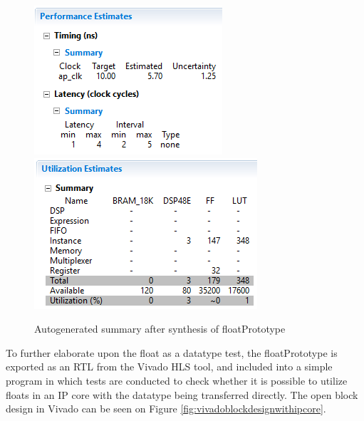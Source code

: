 \begin{figure}[H]
	\centering
	\includegraphics[width=0.428\linewidth]{diagram/floatPrototype_performance_summary}
	\includegraphics[width=0.5\linewidth]{diagram/floatPrototype_synthesis_summary}
	\caption{Autogenerated summary after synthesis of floatPrototype}
	\label{fig:floatprototypesynthesissummary}
\end{figure}


To further elaborate upon the float as a datatype test, the floatPrototype is exported as an RTL from the Vivado HLS tool, and included into a simple program in which tests are conducted to check whether it is possible to utilize floats in an IP core with the datatype being transferred directly. The open block design in Vivado can be seen on Figure \ref{fig:vivadoblockdesignwithipcore}.\\

